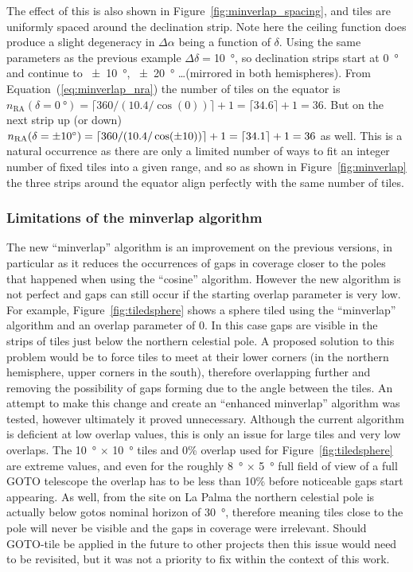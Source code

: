 \begin{colsection}
\begin{colsection}
The effect of this is also shown in Figure~\ref{fig:minverlap_spacing}, and tiles are uniformly spaced around the declination strip. Note here the ceiling function does produce a slight degeneracy in $\Delta\alpha$ being a function of $\delta$. Using the same parameters as the previous example $\Delta\delta=$\SI{10}{\degree}, so declination strips start at \SI{0}{\degree} and continue to \SI{\pm10}{\degree}, \SI{\pm20}{\degree} \ldots (mirrored in both hemispheres). From Equation~(\ref{eq:minverlap_nra}) the number of tiles on the equator is $n_\text{RA}(\delta=\SI{0}{\degree}) = \lceil 360/(10.4/\cos(0)) \rceil + 1 = \lceil 34.6 \rceil + 1 = 36$. But on the next strip up (or down) $n_\text{RA}(\delta=\SI{\pm10}{\degree}) = \lceil 360/(10.4/\cos(\pm10)) \rceil + 1 = \lceil 34.1 \rceil + 1 = 36$ as well. This is a natural occurrence as there are only a limited number of ways to fit an integer number of fixed tiles into a given range, and so as shown in Figure~\ref{fig:minverlap} the three strips around the equator align perfectly with the same number of tiles.

\subsubsection{Limitations of the minverlap algorithm}

The new ``minverlap'' algorithm is an improvement on the previous versions, in particular as it reduces the occurrences of gaps in coverage closer to the poles that happened when using the ``cosine'' algorithm. However the new algorithm is not perfect and gaps can still occur if the starting overlap parameter is very low. For example, Figure~\ref{fig:tiledsphere} shows a sphere tiled using the ``minverlap'' algorithm and an overlap parameter of 0. In this case gaps are visible in the strips of tiles just below the northern celestial pole. A proposed solution to this problem would be to force tiles to meet at their lower corners (in the northern hemisphere, upper corners in the south), therefore overlapping further and removing the possibility of gaps forming due to the angle between the tiles. An attempt to make this change and create an ``enhanced minverlap'' algorithm was tested, however ultimately it proved unnecessary. Although the current algorithm is deficient at low overlap values, this is only an issue for large tiles and very low overlaps. The \SI{10}{\degree} $\times$ \SI{10}{\degree} tiles and 0\% overlap used for Figure~\ref{fig:tiledsphere} are extreme values, and even for the roughly \SI{8}{\degree} $\times$ \SI{5}{\degree} full field of view of a full GOTO telescope the overlap has to be less than 10\% before noticeable gaps start appearing. As well, from the site on La Palma the northern celestial pole is actually below \glspl{goto} nominal horizon of \SI{30}{\degree}, therefore meaning tiles close to the pole will never be visible and the gaps in coverage were irrelevant. Should GOTO-tile be applied in the future to other projects then this issue would need to be revisited, but it was not a priority to fix within the context of this work.


\end{colsection}
\end{colsection}
